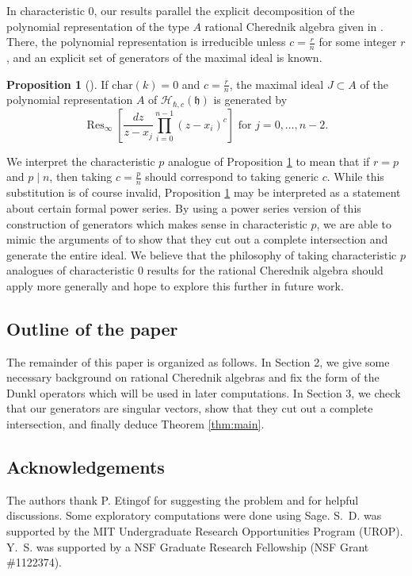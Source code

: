 \documentclass{amsart}
\numberwithin{equation}{section}
\theoremstyle{definition}
\newtheorem{proposition}[equation]{Proposition}
\newcommand{\Res}{\operatorname{Res}}
\newcommand{\h}{\mathfrak{h}}
\newcommand{\HH}{\mathcal{H}}
\renewcommand{\char}{\text{char}}
\begin{document}
In characteristic $0$, our results parallel the explicit decomposition of the polynomial representation of the type $A$ rational Cherednik algebra given in \cite{BEG, CE}.  There, the polynomial representation is irreducible unless $c = \frac{r}{n}$ for some integer $r$, and an explicit set of generators of the maximal ideal is known.
\begin{proposition}[{\cite[Proposition 3.1]{CE}}] \label{prop:ce}
If $\char(k) = 0$ and $c = \frac{r}{n}$, the maximal ideal $J \subset A$ of the polynomial representation $A$ of $\HH_{\hbar,c}(\h)$ is generated by
\[
\Res_\infty\left[\frac{dz}{z-x_j} \prod_{i=0}^{n-1} (z-x_i)^c\right] \text{ for $j=0,\dots,n-2$}.
\]
\end{proposition}
We interpret the characteristic $p$ analogue of Proposition \ref{prop:ce} to mean that if $r = p$ and $p \mid n$, then taking $c = \frac{p}{n}$ should correspond to taking generic $c$.  While this substitution is of course invalid, Proposition \ref{prop:ce} may be interpreted as a statement about certain formal power series.  By using a power series version of this construction of generators which  makes sense in characteristic $p$, we are able to mimic the arguments of \cite{BEG, CE} to show that they cut out a complete intersection and generate the entire ideal.  We believe that the philosophy of taking characteristic $p$ analogues of characteristic $0$ results for the rational Cherednik algebra should apply more generally and hope to explore this further in future work.

\subsection{Outline of the paper}

The remainder of this paper is organized as follows.  In Section 2, we give some necessary background on rational Cherednik algebras and fix the form of the Dunkl operators which will be used in later computations.  In Section 3, we check that our generators are singular vectors, show that they cut out a complete intersection, and finally deduce Theorem \ref{thm:main}.

\subsection{Acknowledgements} 

The authors thank P. Etingof for suggesting the problem and for helpful discussions.  Some exploratory computations were done using Sage.  S.~D. was supported by the MIT Undergraduate Research Opportunities Program (UROP). Y.~S. was supported by a NSF Graduate Research Fellowship (NSF Grant \#1122374).
\end{document}
